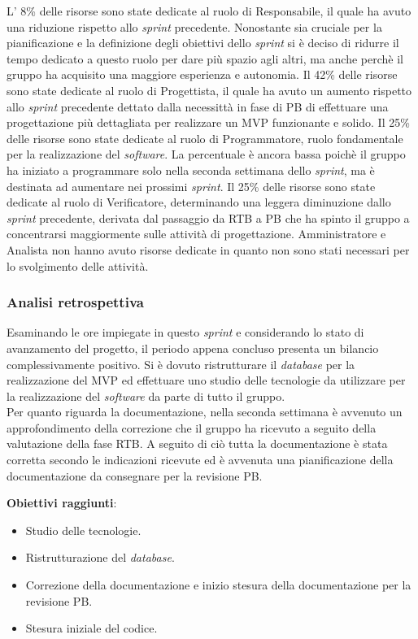 L' 8\% delle risorse sono state dedicate al ruolo di Responsabile, il quale ha avuto una riduzione rispetto allo \textit{sprint} precedente. Nonostante sia
cruciale per la pianificazione e la definizione degli obiettivi dello \textit{sprint} si è deciso di ridurre il tempo dedicato a questo ruolo per dare più spazio agli altri, ma anche perchè il gruppo ha acquisito una maggiore esperienza e autonomia. Il 42\% delle risorse sono state dedicate al ruolo di Progettista, il quale ha avuto un aumento rispetto allo \textit{sprint} precedente dettato dalla necessittà in fase di PB di effettuare una progettazione più dettagliata per realizzare un MVP funzionante e solido.
Il 25\% delle risorse sono state dedicate al ruolo di Programmatore, ruolo fondamentale per la realizzazione del \textit{software}. La percentuale è ancora bassa poichè
il gruppo ha iniziato a programmare solo nella seconda settimana dello \textit{sprint}, ma è destinata ad aumentare nei prossimi \textit{sprint}.
Il 25\% delle risorse sono state dedicate al ruolo di Verificatore, determinando una leggera diminuzione dallo \textit{sprint} precedente, derivata dal passaggio da RTB a PB che ha spinto il gruppo a concentrarsi maggiormente sulle attività di progettazione.
Amministratore e Analista non hanno avuto risorse dedicate in quanto non sono stati necessari per lo svolgimento delle attività.


\subsubsection{Analisi retrospettiva}
Esaminando le ore impiegate in questo \textit{sprint} e considerando lo stato di avanzamento del progetto, il periodo appena concluso presenta un bilancio complessivamente positivo.
Si è dovuto ristrutturare il \textit{database} per la realizzazione del MVP ed effettuare uno studio delle tecnologie da utilizzare per la realizzazione del \textit{software} da parte di tutto il gruppo.\\
Per quanto riguarda la documentazione, nella seconda settimana è avvenuto un approfondimento della correzione che il gruppo ha ricevuto a seguito della valutazione della fase RTB.
A seguito di ciò tutta la documentazione è stata corretta secondo le indicazioni ricevute ed è avvenuta una pianificazione della documentazione da consegnare per la revisione PB.

\textbf{Obiettivi raggiunti}:
\begin{itemize}
	\item Studio delle tecnologie.
	\item Ristrutturazione del \textit{database}.
	\item Correzione della documentazione e inizio stesura della documentazione per la revisione PB.
	\item Stesura iniziale del codice.
\end{itemize}


